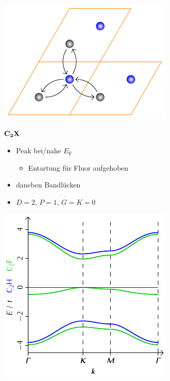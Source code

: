 \documentclass{beamer}
\newcommand \inlinetitle[1]{\begin{center} \color{MidnightBlue} \bf \Large #1 \end{center}}
\begin{document}
	\begin{frame}
		\begin{minipage}[b][0.48\textwidth][c]{0.48\textwidth}
			\includegraphics[width=\textwidth]{Abbildungen/Raumstrukturen/C2X.pdf}
		\end{minipage}
		\hfill
		\begin{minipage}[b][0.48\textwidth][c]{0.48\textwidth}
			\inlinetitle{$\bf C_{\boldsymbol 2}X$}
			\begin{itemize}
				\item Peak bei/nahe $E_\text{F}$
				\begin{itemize}
					\item Entartung für Fluor aufgehoben
				\end{itemize}
				\item daneben Bandlücken
				\item $D = 2$, $P = 1$, $G = K = 0$
			\end{itemize}
		\end{minipage}
		\begin{minipage}{0.48\textwidth}
			\includegraphics[width=\textwidth]{Abbildungen/Bandstrukturen/C2X.pdf}

\end{minipage}
\end{frame}
\end{document}

